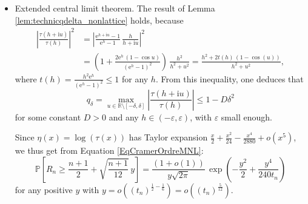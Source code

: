 \documentclass[12pt,a4paper,reqno]{amsart}
\theoremstyle{remark}
\newcommand{\N}{\mathbb{N}}
\newcommand{\R}{\mathbb{R}}
\newcommand{\E}{\mathrm{e}}
\newcommand{\I}{\mathrm{i}}
\newcommand{\proba}{\mathbb{P}}
\newcommand{\eps}{\varepsilon}
\begin{document}
\begin{itemize}
    $$\eps \in(2\eta'(0)-1,2\eta'(\log 2)-1) = \left(0,\,3-\frac{2}{\log 2}\right)\supseteq (0,0.114),$$
     we obtain the large deviation estimate:
    $$\proba\!\left[R_n \geq \frac{(1+\eps)(n+1)}{2}\right] = \frac{\E^{-t_n\,F(\frac{1+\eps}{2})}}{h\sqrt{2\pi t_n\,\eta''(h)}} (1+o(1))$$
    since we have mod-$U$ convergence of $(R_n)_{n \in \N}$ with parameters $t_n=\frac{n+1}{2}$ and residue $\psi(x)=1$. Similarly, for the negative deviations, the estimate of the Fourier transform of the tilted random variable $R^h_n$ can be used if $h>h_0$, where $h_0 \approx -1.594$ is the solution of the equation $\tau(h)=\frac{1}{2}$. Therefore, for
    $$\eps \in \left(0,\,\frac{2}{h_0}-1\right) \supseteq (0,0.254),$$
    we have
    $$\proba\!\left[R_n \leq \frac{(1-\eps)(n+1)}{2}\right] = \frac{\E^{-t_n\,F(\frac{1-\eps}{2})}}{|h|\sqrt{2\pi t_n\,\eta''(h)}} (1+o(1)),$$
    where $h$ is the solution of $\frac{1-\eps}{2}=\eta'(h)$.\vspace{2mm}
    \item Extended central limit theorem. The result of Lemma \ref{lem:technicqdelta_nonlattice} holds, because
\begin{align*}
\left|\frac{\tau(h+\I u)}{\tau(h)}\right|^2 &= \left|\frac{\E^{h+\I u}-1}{\E^{h}-1}\,\frac{h}{h+\I u}\right|^2 \\
&=\left(1+\frac{2\E^h\,(1-\cos u)}{(\E^h-1)^2}\right) \,\frac{h^2}{h^2+u^2} = \frac{h^2+2t(h)\,(1-\cos(u))}{h^2+u^2},
\end{align*}
where $t(h) = \frac{h^2\E^h}{(\E^h-1)^2} \leq 1$ for any $h$. From this inequality, one deduces that
$$q_\delta = \max_{u \in \R\setminus [-\delta,\delta]} \left|\frac{\tau(h+\I u)}{\tau(h)}\right| \leq 1-D\delta^2 $$
for some constant $D>0$ and any $h \in (-\eps,\eps)$, with $\eps$ small enough.\medskip

Since $\eta(x)=\log (\tau(x))$ has Taylor expansion $\frac{x}{2}+\frac{x^2}{24}-\frac{x^4}{2880}+o(x^5)$, we thus get from Equation \eqref{EqCramerOrdreMNL}:
$$\proba\!\left[R_n \geq \frac{n+1}{2} + \sqrt{\frac{n+1}{12}}\,y\right] =\frac{(1+o(1))}{y\sqrt{2\pi}}\,\exp\left(-\frac{y^2}{2} + \frac{y^4}{240t_n}\right)$$
for any positive $y$ with $y = o((t_n)^{\frac{1}{2}-\frac{1}{6}}) = o((t_n)^{\frac{5}{12}})$. 
\end{itemize}
\bigskip
\end{document}
